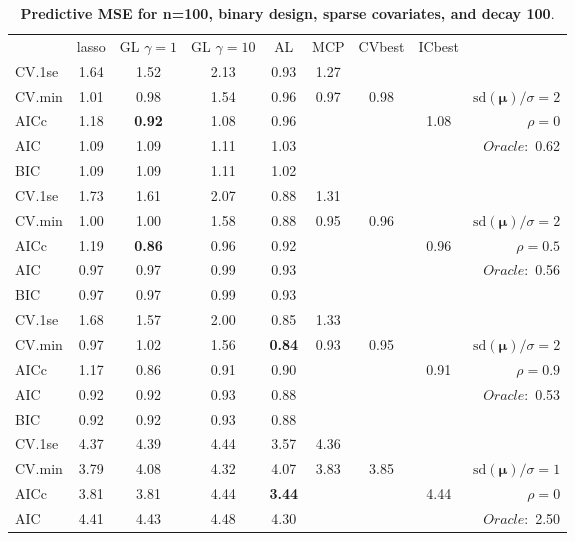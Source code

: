 \begin{table}\vspace{-.5cm}
\caption[l]{ { \bf Predictive MSE for n=100, binary design, 
sparse covariates, and  decay  100}.}
\vspace{-.5cm}
\footnotesize{}
\begin{center}
\begin{tabular}{l*{7}{c}|r}
 & lasso & GL $\gamma=1$ & GL $\gamma=10$ & AL & MCP  & CVbest & ICbest  \\
\cline{1-9}
CV.1se & 1.64 & 1.52 & 2.13 & 0.93 & 1.27 & & & \\
CV.min & 1.01 & 0.98 & 1.54 & 0.96 & 0.97 & 0.98 & & $\mathrm{sd}(\mathbf{\mu})/\sigma=2$ \\
AICc & 1.18 & {\bf 0.92} & 1.08 & 0.96 & & & 1.08 &  $\rho=0$ \\
AIC & 1.09 & 1.09 & 1.11 & 1.03 & & & &  \multirow{2}{*}{$Oracle: $ 0.62} \\
BIC & 1.09 & 1.09 & 1.11 & 1.02 & & & &  \\
 \hline 
CV.1se & 1.73 & 1.61 & 2.07 & 0.88 & 1.31 & & & \\
CV.min & 1.00 & 1.00 & 1.58 & 0.88 & 0.95 & 0.96 & & $\mathrm{sd}(\mathbf{\mu})/\sigma=2$ \\
AICc & 1.19 & {\bf 0.86} & 0.96 & 0.92 & & & 0.96 &  $\rho=0.5$ \\
AIC & 0.97 & 0.97 & 0.99 & 0.93 & & & &  \multirow{2}{*}{$Oracle: $ 0.56} \\
BIC & 0.97 & 0.97 & 0.99 & 0.93 & & & &  \\
 \hline 
CV.1se & 1.68 & 1.57 & 2.00 & 0.85 & 1.33 & & & \\
CV.min & 0.97 & 1.02 & 1.56 & {\bf 0.84} & 0.93 & 0.95 & & $\mathrm{sd}(\mathbf{\mu})/\sigma=2$ \\
AICc & 1.17 & 0.86 & 0.91 & 0.90 & & & 0.91 &  $\rho=0.9$ \\
AIC & 0.92 & 0.92 & 0.93 & 0.88 & & & &  \multirow{2}{*}{$Oracle: $ 0.53} \\
BIC & 0.92 & 0.92 & 0.93 & 0.88 & & & &  \\
 \hline 
CV.1se & 4.37 & 4.39 & 4.44 & 3.57 & 4.36 & & & \\
CV.min & 3.79 & 4.08 & 4.32 & 4.07 & 3.83 & 3.85 & & $\mathrm{sd}(\mathbf{\mu})/\sigma=1$ \\
AICc & 3.81 & 3.81 & 4.44 & {\bf 3.44} & & & 4.44 &  $\rho=0$ \\
AIC & 4.41 & 4.43 & 4.48 & 4.30 & & & &  \multirow{2}{*}{$Oracle: $ 2.50} \\

\end{tabular}
\end{center}
\end{table}
